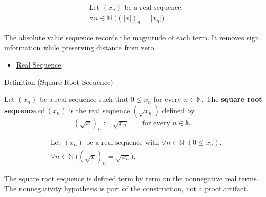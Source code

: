 \begin{remark*}
\[
\begin{aligned}
&\text{Let } (x_n) \text{ be a real sequence.}\\
&\forall n\in\mathbb{N}\;\bigl((|x|)_n=|x_n|\bigr).
\end{aligned}
\]
\end{remark*}

\begin{remark*}[Interpretation]
The absolute value sequence records the magnitude of each term. It removes
sign information while preserving distance from zero.
\end{remark*}

\begin{dependencies}
\begin{itemize}
  \item \hyperref[def:real-sequence]{Real Sequence}
\end{itemize}
\end{dependencies}


\begin{definitionbox}{Definition (Square Root Sequence)}
\begin{definition}
\label{def:square-root-sequence}
Let $(x_n)$ be a real sequence such that $0\le x_n$ for every
$n\in\mathbb{N}$. The \textbf{square root sequence} of $(x_n)$ is the real
sequence $(\sqrt{x_n})$ defined by
\[
(\sqrt{x})_n := \sqrt{x_n}
\qquad
\text{for every } n\in\mathbb{N}.
\]
\end{definition}
\end{definitionbox}

\begin{remark*}
\[
\begin{aligned}
&\text{Let } (x_n) \text{ be a real sequence with }
  \forall n\in\mathbb{N}\;(0\le x_n).\\
&\forall n\in\mathbb{N}\;\bigl((\sqrt{x})_n=\sqrt{x_n}\bigr).
\end{aligned}
\]
\end{remark*}

\begin{remark*}[Interpretation]
The square root sequence is defined term by term on the nonnegative real
terms. The nonnegativity hypothesis is part of the construction, not a proof
artifact.
\end{remark*}

